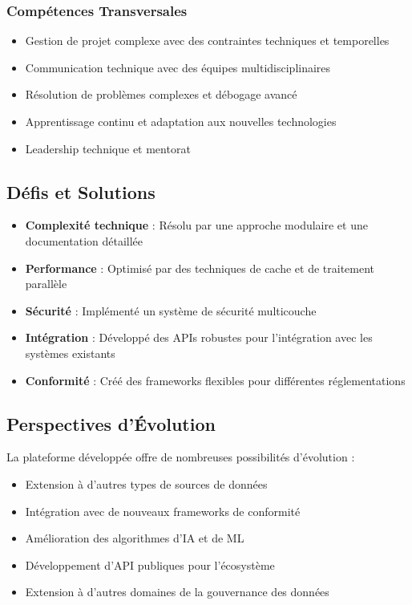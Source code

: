 \documentclass[12pt,a4paper]{article}
\begin{document}
\subsubsection{Compétences Transversales}
\begin{itemize}
    \item Gestion de projet complexe avec des contraintes techniques et temporelles
    \item Communication technique avec des équipes multidisciplinaires
    \item Résolution de problèmes complexes et débogage avancé
    \item Apprentissage continu et adaptation aux nouvelles technologies
    \item Leadership technique et mentorat
\end{itemize}

\subsection{Défis et Solutions}
\begin{itemize}
    \item \textbf{Complexité technique} : Résolu par une approche modulaire et une documentation détaillée
    \item \textbf{Performance} : Optimisé par des techniques de cache et de traitement parallèle
    \item \textbf{Sécurité} : Implémenté un système de sécurité multicouche
    \item \textbf{Intégration} : Développé des APIs robustes pour l'intégration avec les systèmes existants
    \item \textbf{Conformité} : Créé des frameworks flexibles pour différentes réglementations
\end{itemize}

\subsection{Perspectives d'Évolution}
La plateforme développée offre de nombreuses possibilités d'évolution :
\begin{itemize}
    \item Extension à d'autres types de sources de données
    \item Intégration avec de nouveaux frameworks de conformité
    \item Amélioration des algorithmes d'IA et de ML
    \item Développement d'API publiques pour l'écosystème
    \item Extension à d'autres domaines de la gouvernance des données
\end{itemize}
\end{document}
